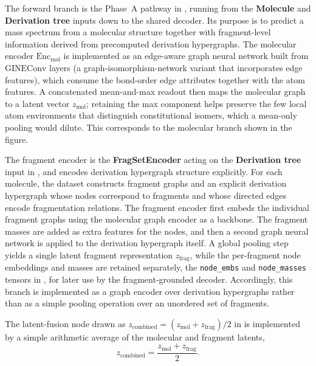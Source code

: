 The forward branch is the Phase~A pathway in , running from the \textbf{Molecule} and \textbf{Derivation tree} inputs down to the shared decoder.
Its purpose is to predict a mass spectrum from a molecular structure together with fragment-level information derived from precomputed derivation hypergraphs.
The molecular encoder $\mathrm{Enc}_{\mathrm{mol}}$ is implemented as an edge-aware graph neural network built from $\mathrm{GINEConv}$ layers (a graph-isomorphism-network variant that incorporates edge features), which consume the bond-order edge attributes together with the atom features.
A concatenated mean-and-max readout then maps the molecular graph to a latent vector $z_{\mathrm{mol}}$; retaining the max component helps preserve the few local atom environments that distinguish constitutional isomers, which a mean-only pooling would dilute.
This corresponds to the molecular branch shown in the figure.

The fragment encoder is the \textbf{FragSetEncoder} acting on the \textbf{Derivation tree} input in , and encodes derivation hypergraph structure explicitly.
For each molecule, the dataset constructs fragment graphs and an explicit derivation hypergraph whose nodes correspond to fragments and whose directed edges encode fragmentation relations.
The fragment encoder first embeds the individual fragment graphs using the molecular graph encoder as a backbone.
The fragment masses are added as extra features for the nodes, and then a second graph neural network is applied to the derivation hypergraph itself.
A global pooling step yields a single latent fragment representation $z_{\mathrm{frag}}$, while the per-fragment node embeddings and masses are retained separately, the \texttt{node\_embs} and \texttt{node\_masses} tensors in , for later use by the fragment-grounded decoder.
Accordingly, this branch is implemented as a graph encoder over derivation hypergraphs rather than as a simple pooling operation over an unordered set of fragments.

The latent-fusion node drawn as $z_{\mathrm{combined}}=(z_{\mathrm{mol}}+z_{\mathrm{frag}})/2$ in  is implemented by a simple arithmetic average of the molecular and fragment latents,
\begin{equation}
    \label{eq:arithmetic_fusion}
    z_{\mathrm{combined}} = \frac{z_{\mathrm{mol}} + z_{\mathrm{frag}}}{2}.
\end{equation}

